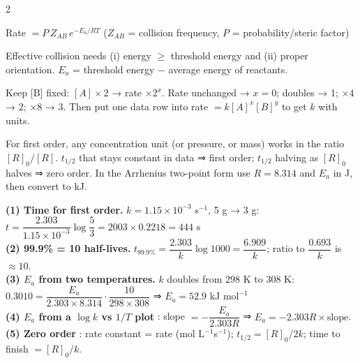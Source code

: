 \documentclass[9pt,a4paper]{extarticle}
\begin{document}
\begin{multicols}{2}
\begin{kbox}
Rate $=P\,Z_{AB}\,e^{-E_a/RT}$ \quad ($Z_{AB}$ = collision frequency, $P$ = probability/steric factor)
\end{kbox}
\begin{fl}
\item Effective collision needs (i) energy $\ge$ threshold energy and (ii) proper orientation. $E_a$ = threshold energy $-$ average energy of reactants.
\end{fl}
\begin{fl}
\item Keep [B] fixed: $[A]\times2$ → rate $\times2^x$. Rate unchanged → $x=0$; doubles → 1; $\times4$ → 2; $\times8$ → 3. Then put one data row into rate $=k[A]^x[B]^y$ to get $k$ with units.
\end{fl}
\begin{tip}\Tip For first order, any concentration unit (or pressure, or mass) works in the ratio $[R]_0/[R]$. $t_{1/2}$ that stays constant in data ⇒ first order; $t_{1/2}$ halving as $[R]_0$ halves ⇒ zero order. In the Arrhenius two-point form use $R=8.314$ and $E_a$ in J, then convert to kJ.\end{tip}
\begin{numbox}\Num\par\scriptsize
\textbf{(1) Time for first order.} $k=1.15\times10^{-3}$ s$^{-1}$, 5 g → 3 g: $t=\dfrac{2.303}{1.15\times10^{-3}}\log\dfrac53=2003\times0.2218=\boxed{444\text{ s}}$\\[1pt]
\textbf{(2) 99.9\% = 10 half-lives.} $t_{99.9\%}=\dfrac{2.303}{k}\log1000=\dfrac{6.909}{k}$; ratio to $\dfrac{0.693}{k}$ is $\approx10$.\\[1pt]
\textbf{(3) $E_a$ from two temperatures.} $k$ doubles from 298 K to 308 K: $0.3010=\dfrac{E_a}{2.303\times8.314}\cdot\dfrac{10}{298\times308}$ ⇒ $E_a=\boxed{52.9\text{ kJ mol}^{-1}}$\\[1pt]
\textbf{(4) $E_a$ from a $\log k$ vs $1/T$ plot} \SQP: slope $=-\dfrac{E_a}{2.303R}$ ⇒ $E_a=-2.303R\times\text{slope}$.\\[1pt]
\textbf{(5) Zero order} \SQP: rate constant = rate (mol L$^{-1}$s$^{-1}$); $t_{1/2}=[R]_0/2k$; time to finish $=[R]_0/k$.
\end{numbox}

\end{multicols}
\end{document}
